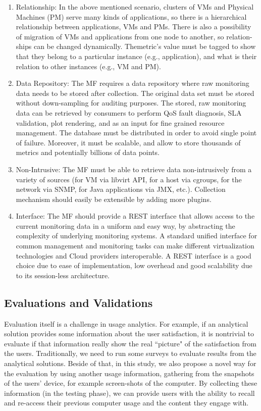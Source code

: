 \begin{enumerate}
\item Relationship: In the above mentioned scenario, clusters of VMs and Physical Machines (PM) serve many kinds of applications, so there is a hierarchical relationship between applications, VMs and PMs.
There is also a possibility of migration of VMs and applications from one node to another, so relation- ships can be changed dynamically. Themetric’s value must be tagged to show that they belong to a particular instance (e.g., application), and what is their relation to other instances (e.g., VM and PM). 
\item Data Repository: The MF requires a data repository where raw monitoring data needs to be stored after collection. The original data set must be stored without down-sampling for auditing purposes. The stored, raw monitoring data can be retrieved by consumers to perform QoS fault diagnosis, SLA validation, plot rendering, and as an input for fine grained resource management. The database must be distributed in order to avoid single point of failure. Moreover, it must be scalable, and allow to store thousands of metrics and potentially billions of data points. 
\item Non-Intrusive: The MF must be able to retrieve data non-intrusively from a variety of sources (for VM via libvirt API, for a host via cgroups, for the network via SNMP, for Java applications via JMX, etc.). Collection mechanism should easily be extensible by adding more plugins. 
\item Interface: The MF should provide a REST interface that allows access to the current monitoring data in a uniform and easy way, by abstracting the complexity of underlying monitoring systems. A standard unified interface for common management and monitoring tasks can make different virtualization technologies and Cloud providers interoperable. A REST interface is a good choice due to ease of implementation, low overhead and good scalability due to its session-less architecture.
\end{enumerate} 

\subsection{Evaluations and Validations}
Evaluation itself is a challenge in usage analytics. For example, if an analytical solution provides some information about the user satisfaction, it is nontrivial to evaluate if that information really show the real ``picture" of the satisfaction from the users. Traditionally, we need to run some surveys to evaluate results from the analytical solutions. Beside of that, in this study, we also propose a novel way for the evaluation by using another usage information, gathering from the snapshots of the users' device, for example screen-shots of the computer. By collecting these information (in the testing phase), we can provide users with the ability to recall and re-access their previous computer usage and the content they engage with. 